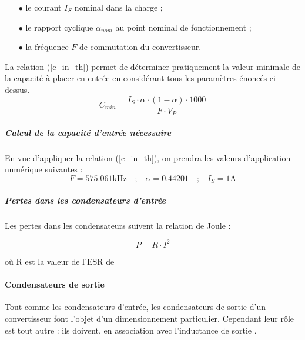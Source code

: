 						\begin{itemize}
							\item[$\bullet$] le courant $I_{S}$ nominal dans la charge ;
							\item[$\bullet$] le rapport cyclique  $\alpha_{nom}$ au point nominal de fonctionnement ;
							\item[$\bullet$] la fréquence $F$ de commutation du convertisseur.	
						\end{itemize}
						
						La relation (\ref{c_in_th}) permet de déterminer pratiquement la valeur minimale de la capacité à placer en entrée en considérant tous les paramètres énoncés ci-dessus.
						\begin{equation}
							C_{min} = \frac{I_S\cdot\alpha\cdot(1-\alpha)\cdot 1000}{F\cdot V_P}
							\label{c_in_th}
						\end{equation}
						
						\subparagraph{Calcul de la capacité d'entrée nécessaire}
						
						En vue d'appliquer la relation (\ref{c_in_th}), on prendra les valeurs d'application numérique suivantes :		
						\begin{equation}
							F = 575.061\text{kHz} 
							\quad\text{;}\quad
							\alpha = 0.44201
							\quad\text{;}\quad
							I_S = 1\text{A}
						\end{equation}
						
						\subparagraph{Pertes dans les condensateurs d'entrée}
						
						Les pertes dans les condensateurs suivent la relation de Joule :
						
						\begin{equation}
							P = R \cdot I^2
						\end{equation}
						
						où R est la valeur de l'ESR de
						
								
							\paragraph{Condensateurs de sortie}
							
							Tout comme les condensateurs d'entrée, les condensateurs de sortie d'un convertisseur font l'objet d'un dimensionnement particulier. Cependant leur rôle est tout autre : ils doivent, en association avec l'inductance de sortie \cite{A055}.	
				
				
			
